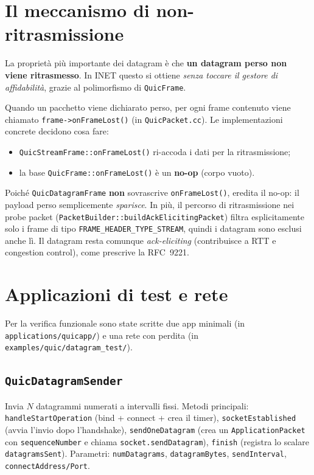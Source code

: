 \documentclass[11pt,a4paper]{article}
\newcommand{\code}[1]{\texttt{#1}}
\begin{document}
\section{Il meccanismo di non-ritrasmissione}\label{sec:noretx}
La propriet\`a pi\`u importante dei datagram \`e che \textbf{un datagram perso non viene ritrasmesso}. In INET
questo si ottiene \emph{senza toccare il gestore di affidabilit\`a}, grazie al polimorfismo di
\code{QuicFrame}.

Quando un pacchetto viene dichiarato perso, per ogni frame contenuto viene chiamato
\code{frame->onFrameLost()} (in \code{QuicPacket.cc}). Le implementazioni concrete decidono cosa fare:
\begin{itemize}[nosep,leftmargin=1.4em]
  \item \code{QuicStreamFrame::onFrameLost()} ri-accoda i dati per la ritrasmissione;
  \item la base \code{QuicFrame::onFrameLost()} \`e un \textbf{no-op} (corpo vuoto).
\end{itemize}
Poich\'e \code{QuicDatagramFrame} \textbf{non} sovrascrive \code{onFrameLost()}, eredita il no-op: il payload
perso semplicemente \emph{sparisce}. In pi\`u, il percorso di ritrasmissione nei probe packet
(\code{PacketBuilder::buildAckElicitingPacket}) filtra esplicitamente solo i frame di tipo
\code{FRAME\_HEADER\_TYPE\_STREAM}, quindi i datagram sono esclusi anche l\`i. Il datagram resta comunque
\emph{ack-eliciting} (contribuisce a RTT e congestion control), come prescrive la RFC~9221.

\section{Applicazioni di test e rete}
Per la verifica funzionale sono state scritte due app minimali (in \code{applications/quicapp/}) e una rete
con perdita (in \code{examples/quic/datagram\_test/}).

\subsection{\code{QuicDatagramSender}}
Invia $N$ datagrammi numerati a intervalli fissi. Metodi principali:
\code{handleStartOperation} (bind + connect + crea il timer), \code{socketEstablished} (avvia l'invio dopo
l'handshake), \code{sendOneDatagram} (crea un \code{ApplicationPacket} con \code{sequenceNumber} e chiama
\code{socket.sendDatagram}), \code{finish} (registra lo scalare \code{datagramsSent}). Parametri:
\code{numDatagrams}, \code{datagramBytes}, \code{sendInterval}, \code{connectAddress/Port}.
\end{document}
